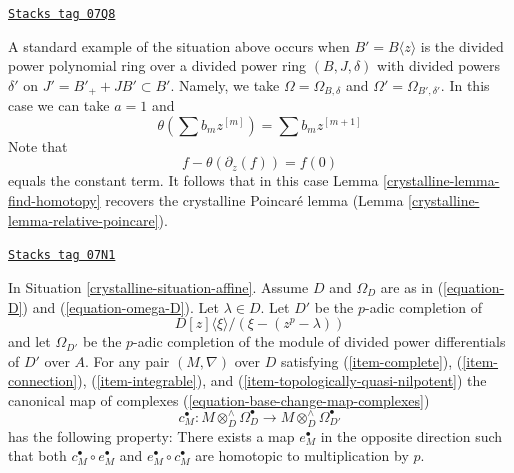 \begin{example}[Integrate]
\label{crystalline-example-integrate}
\href{https://stacks.math.columbia.edu/tag/07Q8}{\texttt{Stacks tag 07Q8}}

A standard example of the situation above occurs when
$B' = B\langle z \rangle$ is the divided power polynomial ring
over a divided power ring $(B, J, \delta)$ with divided powers
$\delta'$ on $J' = B'_{+} + JB' \subset B'$. Namely, we take
$\Omega = \Omega_{B, \delta}$ and $\Omega' = \Omega_{B', \delta'}$.
In this case we can take $a = 1$ and
$$
\theta( \sum b_m z^{[m]} ) = \sum b_m z^{[m + 1]}
$$
Note that
$$
f - \theta(\partial_z(f)) = f(0)
$$
equals the constant term. It follows that in this case
Lemma \ref{crystalline-lemma-find-homotopy}
recovers the crystalline Poincar\'e lemma
(Lemma \ref{crystalline-lemma-relative-poincare}).
\end{example}

\begin{lemma}[Computation]
\label{crystalline-lemma-computation}
\href{https://stacks.math.columbia.edu/tag/07N1}{\texttt{Stacks tag 07N1}}

In Situation \ref{crystalline-situation-affine}. Assume $D$ and $\Omega_D$ are as in
(\ref{equation-D}) and (\ref{equation-omega-D}).
Let $\lambda \in D$. Let $D'$ be the $p$-adic completion of
$$
D[z]\langle \xi \rangle/(\xi - (z^p - \lambda))
$$
and let $\Omega_{D'}$ be the $p$-adic completion of the module of
divided power differentials of $D'$ over $A$. For any pair $(M, \nabla)$
over $D$ satisfying (\ref{item-complete}), (\ref{item-connection}),
(\ref{item-integrable}), and (\ref{item-topologically-quasi-nilpotent})
the canonical map of complexes (\ref{equation-base-change-map-complexes})
$$
c_M^\bullet : M \otimes_D^\wedge \Omega^\bullet_D
\longrightarrow
M \otimes_D^\wedge \Omega^\bullet_{D'}
$$
has the following property: There exists a map $e_M^\bullet$
in the opposite direction such that both $c_M^\bullet \circ e_M^\bullet$
and $e_M^\bullet \circ c_M^\bullet$ are homotopic to multiplication by $p$.
\end{lemma}

